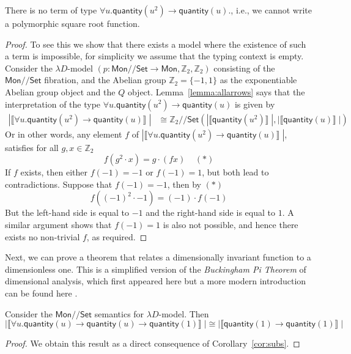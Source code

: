 \documentclass[a4paper,UKenglish]{lipics}
\newcommand{\msf}[1]{\mathsf{#1}} %
\newcommand{\Mon}{\msf{Mon}}
\newcommand{\Set}{\msf{Set}}
\newcommand{\GroupSet}[1]{#1/\!/\Set}
\newcommand{\MonSet}{\GroupSet{\Mon}}
\newcommand{\bbZ}{\mathbb{Z}}
\newcommand{\sem}[1]{\ensuremath{\llbracket #1 \rrbracket} \;}
\newcommand{\qnt}{\msf{quantity}}
\begin{document}
\begin{theorem}
\label{thm:UninhabType}
 There is no term of type $\forall u . \qnt(u^2) \rightarrow \qnt(u)$., i.e., we cannot write a polymorphic square root function.
\end{theorem}
\begin{proof}
To see this we show that there exists a model where the existence of such a term is impossible, for simplicity we assume that the typing context is empty. Consider the $\lambda D$-model $(p:\MonSet \rightarrow \Mon, \mathbb{Z}_2, \mathbb{Z}_2)$  consisting of the $\MonSet$ fibration, and the Abelian group $\mathbb{Z}_2 = \{ -1, 1\}$ as the exponentiable Abelian group object and the $Q$ object. Lemma~\ref{lemma:allarrows} says that the interpretation of the type $\forall u . \qnt(u^2) \rightarrow \qnt(u)$ is given by
\begin{align*}
  |\sem{\forall u . \qnt(u^2) \rightarrow \qnt(u)}|  &  \cong \GroupSet{\mathbb{Z}_2} (|\sem{\qnt (u^2)}|, |\sem{\qnt(u)}|)
\end{align*}
Or in other words, any element $f$ of $ |\sem{\forall u . \qnt(u^2) \rightarrow \qnt(u)}|$, satisfies for all $g, x \in \bbZ_2$
\[
f (g^2 \cdot x) = g \cdot (fx) \; \; \; \; (\ast)
\]
If $f$ exists, then either $f(-1) = -1$ or $f(-1) = 1$, but both lead to contradictions. Suppose that $f(-1) = -1$, then by $(\ast)$
\[
 f((-1)^2 \cdot -1) = (-1) \cdot f(-1)
\]
But the left-hand side is equal to $-1$ and the right-hand side is equal to $1$. A similar argument shows that $f(-1)=1$ is also not possible, and hence there exists no non-trivial $f$, as required.
\end{proof}

Next, we can prove a theorem that relates a dimensionally invariant function to a dimensionless one. This is a simplified version of the \emph{Buckingham Pi Theorem} of dimensional analysis, which first appeared here \cite{buckingham1914physically} but a more modern introduction can be found here \cite{sonin2001physical}.

\begin{theorem}
 \label{lem:AppSubs}
Consider the $\MonSet$ semantics for $\lambda D$-model. Then
\[
 |\sem{\forall u . \qnt(u) \rightarrow \qnt(u) \rightarrow \qnt(1)}| \cong |\sem{\qnt(1)\rightarrow \qnt(1)}|
\]
\end{theorem}
\begin{proof}
We obtain this result as a direct consequence of Corollary~\ref{cor:subs}.
\end{proof}
\end{document}
